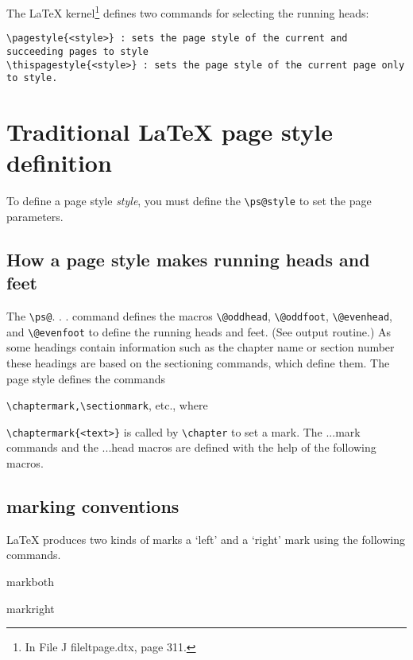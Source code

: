 The LaTeX kernel\footnote{In File J file{ltpage.dtx}, page 311.} defines two commands for selecting the running heads:

\begin{lstlisting}
\pagestyle{<style>} : sets the page style of the current and succeeding pages to style
\thispagestyle{<style>} : sets the page style of the current page only to style.
\end{lstlisting}

\section{Traditional LaTeX page style definition}

To define a page style \textit{style}, you must define the \lstinline{\ps@style} to set the page parameters.

\subsection{How a page style makes running heads and feet}
The \lstinline{\ps@}. . . command defines the macros \lstinline{\@oddhead}, \lstinline{\@oddfoot}, \lstinline{\@evenhead},
and \lstinline{\@evenfoot} to define the running heads and feet. (See output routine.) As some headings contain information such as the chapter name or section number these
headings are based on the sectioning commands, which define them. The page style defines the commands




\verb!\chaptermark,\sectionmark!, etc., where

\verb+\chaptermark{<text>}+ is called by \verb+\chapter+ to set a mark. The  ...mark commands and the ...head
macros are defined with the help of the following macros.



\subsection{marking conventions}

LaTeX produces two kinds of marks a `left' and a `right' mark using the following commands.

markboth

markright



